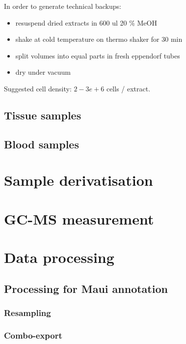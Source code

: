 \documentclass[]{book}
\providecommand{\tightlist}{%
  \setlength{\itemsep}{0pt}\setlength{\parskip}{0pt}}
\theoremstyle{definition}
\theoremstyle{definition}
\theoremstyle{definition}
\theoremstyle{remark}
\begin{document}
In order to generate technical backups:

\begin{itemize}
\tightlist
\item
  resuspend dried extracts in 600 ul 20 \% MeOH
\item
  shake at cold temperature on thermo shaker for 30 min
\item
  split volumes into equal parts in fresh eppendorf tubes
\item
  dry under vacuum
\end{itemize}

Suggested cell density: \(2-3e+6\) cells / extract.

\subsection{Tissue samples}\label{tissue-samples}

\subsection{Blood samples}\label{blood-samples}

\section{Sample derivatisation}\label{sample-derivatisation}

\section{GC-MS measurement}\label{gc-ms-measurement}

\section{Data processing}\label{data-processing}

\subsection{Processing for Maui
annotation}\label{processing-for-maui-annotation}

\subsubsection{Resampling}\label{resampling}

\subsubsection{Combo-export}\label{combo-export}
\end{document}

